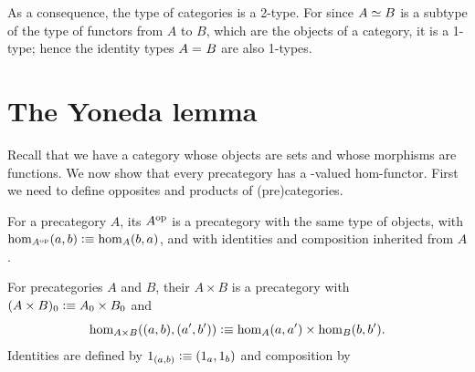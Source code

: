 As a consequence, the type of categories is a 2-type.
For since $A \simeq B$ is a subtype of the type of functors from $A$ to $B$, which are the objects of a category, it is a 1-type; hence the identity types $A =_{} B$ are also 1-types.


\section{The Yoneda lemma}
\label{sec:yoneda}

Recall that we have a category \uset whose objects are sets and whose morphisms are functions.
We now show that every precategory has a \uset-valued hom-functor.
First we need to define opposites and products of (pre)categories.

\begin{defn}\label{ct:opposite-category}
  For a precategory $A$, its 
  $A^{\mathrm{op}}$ is a precategory with the same type of objects, with $\hom_{A^{\mathrm{op}}}(a,b) \vcentcolon\equiv \hom_A(b,a)$, and with identities and composition inherited from $A$.
\end{defn}

\begin{defn}\label{ct:prod-cat}
  For precategories $A$ and $B$, their 
  $A\times B$ is a precategory with $(A\times B)_0 \vcentcolon\equiv A_0 \times B_0$ and
  \[\hom_{A\times B}((a,b),(a',b')) \vcentcolon\equiv \hom_A(a,a') \times \hom_B(b,b').\]
  Identities are defined by $1_{(a,b)}\vcentcolon\equiv (1_a,1_b)$ and composition by
\end{defn}

